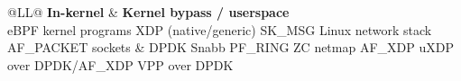 \documentclass[11pt,a4paper]{article}
\begin{document}
\begin{table}[!t]
\centering
\small
\begin{tabularx}{\textwidth}{@{}LL@{}}
\toprule
\textbf{In-kernel} & \textbf{Kernel bypass / userspace} \\
\midrule
eBPF kernel programs \cite{xdp2018,freitas2022,tu2021}\newline
\hspace*{1em}XDP (native/generic) \cite{xdp2018,tu2021}\newline
\hspace*{1em}SK\_MSG \cite{middlenet2023}\newline
Linux network stack \cite{xdp2018,tu2021,ara2020}\newline
\hspace*{1em}AF\_PACKET sockets \cite{valia2026}
&
DPDK \cite{gallenmueller2015,metronome2023,valia2026,tu2021,ara2020}\newline
Snabb \cite{ara2020}\newline
PF\_RING ZC \cite{gallenmueller2015}\newline
netmap \cite{gallenmueller2015}\newline
AF\_XDP \cite{mole2025,edge2023,valia2026,tu2021}\newline
uXDP over DPDK/AF\_XDP \cite{uxdp2025}\newline
VPP over DPDK \cite{ara2020} \\
\bottomrule
\end{tabularx}
\end{table}
\end{document}
